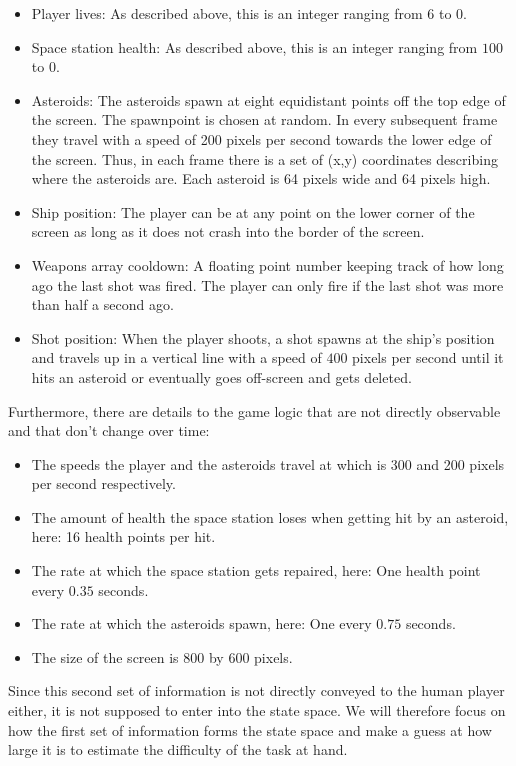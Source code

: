 \documentclass[a4paper,10pt]{article}
\begin{document}
\begin{itemize}
 \item Player lives: As described above, this is an integer ranging from $6$ to $0$.
 \item Space station health: As described above, this is an integer ranging from $100$ to $0$.
 \item Asteroids: The asteroids spawn at eight equidistant points off the top edge of the screen. The spawnpoint is chosen at random. In every subsequent frame they travel with a speed of 200 pixels per second towards the lower edge of the screen. Thus, in each frame there is a set of (x,y) coordinates describing where the asteroids are. Each asteroid is 64 pixels wide and 64 pixels high.
 \item Ship position: The player can be at any point on the lower corner of the screen as long as it does not crash into the border of the screen.
 \item Weapons array cooldown: A floating point number keeping track of how long ago the last shot was fired. The player can only fire if the last shot was more than half a second ago.
 \item Shot position: When the player shoots, a shot spawns at the ship's position and travels up in a vertical line with a speed of $400$ pixels per second until it hits an asteroid or eventually goes off-screen and gets deleted.
\end{itemize}
Furthermore, there are details to the game logic that are not directly observable and that don't change over time:
\begin{itemize}
 \item The speeds the player and the asteroids travel at which is 300 and 200 pixels per second respectively.
 \item The amount of health the space station loses when getting hit by an asteroid, here: 16 health points per hit.
 \item The rate at which the space station gets repaired, here: One health point every $0.35$ seconds.
 \item The rate at which the asteroids spawn, here: One every $0.75$ seconds.
 \item The size of the screen is 800 by 600 pixels.
\end{itemize}

Since this second set of information is not directly conveyed to the human player either, it is not supposed to enter into the state space.
We will therefore focus on how the first set of information forms the state space and make a guess at how large it is to estimate the difficulty of the task at hand.
\end{document}
